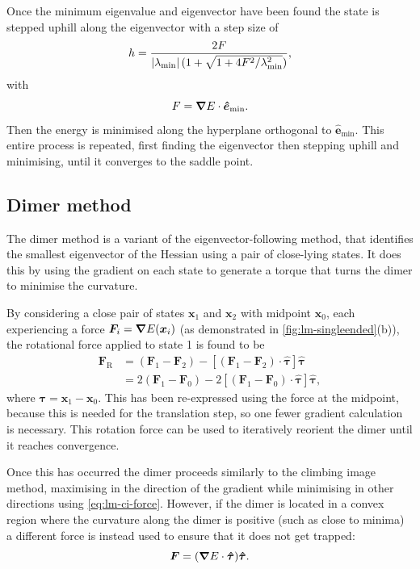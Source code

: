 Once the minimum eigenvalue and eigenvector have been found the state is stepped uphill along the eigenvector with a step size of
\begin{equation}
  h = \frac {2F} {\left| \lambda_\text{min} \right| (1 + \sqrt{1 + 4 F^2 / \lambda_\text{min}^2})},
\end{equation}
with
\begin{equation}
  F = \bm{\nabla} E \cdot \bm{\hat{e}}_\text{min}.
\end{equation}
Then the energy is minimised along the hyperplane orthogonal to $\bm{\hat{e}}_\text{min}$.
This entire process is repeated, first finding the eigenvector then stepping uphill and minimising, until it converges to the saddle point.


\subsection{Dimer method}
The dimer method \cite{Henkelman1999,Heyden2005,Kastner2008} is a variant of the eigenvector-following method, that identifies the smallest eigenvector of the Hessian using a pair of close-lying states.
It does this by using the gradient on each state to generate a torque that turns the dimer to minimise the curvature.

By considering a close pair of states $\bm{x}_1$ and $\bm{x}_2$ with midpoint $\bm{x}_0$, each experiencing a force $\bm{F}_i = \bm{\nabla} E(\bm{x}_i)$ (as demonstrated in \cref{fig:lm-singleended}(b)), the rotational force applied to state 1 is found to be
\begin{equation}
\begin{aligned}
  \bm{F}_\mathrm{R} &= (\bm{F}_1 - \bm{F}_2) - [(\bm{F}_1 - \bm{F}_2) \cdot \bm{\hat{\tau}}] \bm{\hat{\tau}}\\
                    &= 2(\bm{F}_1 - \bm{F}_0) - 2[(\bm{F}_1 - \bm{F}_0) \cdot \bm{\hat{\tau}}] \bm{\hat{\tau}},
\end{aligned}
\end{equation}
where $\bm{\tau} = \bm{x}_1 - \bm{x}_0$.
This has been re-expressed using the force at the midpoint, because this is needed for the translation step, so one fewer gradient calculation is necessary.
This rotation force can be used to iteratively reorient the dimer until it reaches convergence.

Once this has occurred the dimer proceeds similarly to the climbing image method, maximising in the direction of the gradient while minimising in other directions using \cref{eq:lm-ci-force}.
However, if the dimer is located in a convex region where the curvature along the dimer is positive (such as close to minima) a different force is instead used to ensure that it does not get trapped:
\begin{equation}
  \bm{F} = (\bm{\nabla} E \cdot \bm{\hat{\tau}}) \bm{\hat{\tau}}.
\end{equation}




